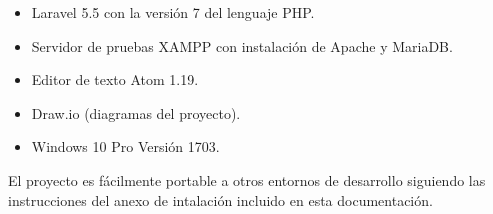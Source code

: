 \begin{itemize}
    \item Laravel 5.5 con la versión 7 del lenguaje PHP.
    \item Servidor de pruebas XAMPP con instalación de Apache y MariaDB.
    \item Editor de texto Atom 1.19.
    \item Draw.io (diagramas del proyecto).
    \item Windows 10 Pro Versión 1703.
\end{itemize}

El proyecto es fácilmente portable a otros entornos de desarrollo siguiendo las instrucciones del anexo de intalación incluido en esta documentación.
